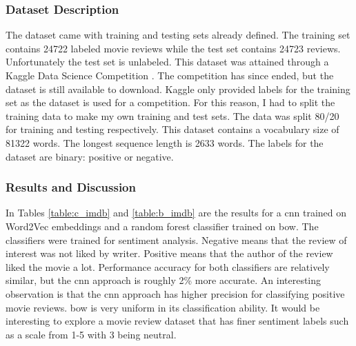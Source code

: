 \documentclass[12pt]{article}
\begin{document}
\subsubsection {Dataset Description}

The dataset came with training and testing sets already defined. The training set contains 24722 labeled movie reviews while the test set contains 24723 reviews. Unfortunately the test set is unlabeled. This dataset was attained through a Kaggle Data Science Competition \cite{kaggle}. The competition has since ended, but the dataset is still available to download. Kaggle only provided labels for the training set as the dataset is used for a competition. For this reason, I had to split the training data to make my own training and test sets. The data was split 80\slash20 for training and testing respectively. This dataset contains a vocabulary size of 81322 words. The longest sequence length is 2633 words. The labels for the dataset are binary: positive or negative. 




\newpage
\subsubsection {Results and Discussion}

%
%

In Tables \ref{table:c_imdb} and \ref{table:b_imdb} are the results for a \ac{cnn} trained on Word2Vec embeddings and a random forest classifier trained on \ac{bow}. The classifiers were trained for sentiment analysis. Negative means that the review of interest was not liked by writer. Positive means that the author of the review liked the movie a lot. Performance accuracy for both classifiers are relatively similar, but the \ac{cnn} approach is roughly 2\% more accurate. An interesting observation is that the \ac{cnn} approach has higher precision for classifying positive movie reviews. \ac{bow} is very uniform in its classification ability. It would be interesting to explore a movie review dataset that has finer sentiment labels such as a scale from 1-5 with 3 being neutral.
\end{document}
